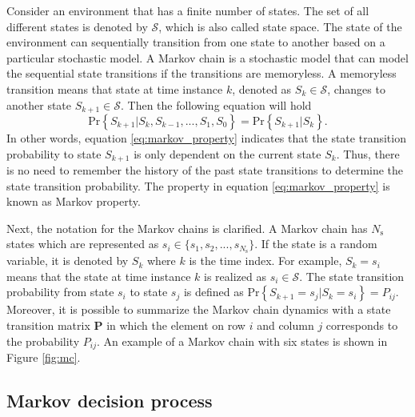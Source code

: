 \documentclass[english, 12pt, a4paper, elec, utf8, a-1b, online]{aaltothesis}
\renewcommand{\vec}[1]{\mathbf{#1}}
\newcommand{\Ss}{\mathcal{S}}
\renewcommand{\Pr}[1]{\text{Pr}\left\{ #1 \right\}}
\newcommand{\stprobs}{\vec{P}}
\newcommand{\nstates}{{N_\text{s}}}
\begin{document}
Consider an environment that has a finite number of states.
The set of all different states is denoted by $\Ss$, which is also called state space.
The state of the environment can sequentially transition from one state to another based on a particular stochastic model.
A Markov chain is a stochastic model that can model the sequential state transitions if the transitions are memoryless.
A memoryless transition means that state at time instance $k$, denoted as $S_k \in \Ss$, changes to another state $S_{k+1} \in \Ss$.
Then the following equation will hold   
\begin{equation} \label{eq:markov_property}
    \Pr{S_{k+1} | S_k, S_{k-1}, ..., S_1, S_0} = \Pr{S_{k+1} | S_k}.
\end{equation}
In other words, equation \eqref{eq:markov_property} indicates that the state transition probability to state $S_{k+1}$ is only dependent on the current state $S_k$.
Thus, there is no need to remember the history of the past state transitions to determine the state transition probability.
The property in equation \eqref{eq:markov_property} is known as Markov property.

Next, the notation for the Markov chains is clarified.
A Markov chain has $\nstates$ states which are represented as $s_i \in \{s_1, s_2, ..., s_{\nstates} \}$.
If the state is a random variable, it is denoted by $S_k$ where $k$ is the time index.
For example, $S_k = s_i$ means that the state at time instance $k$ is realized as $s_i \in \Ss$. 
The state transition probability from state $s_i$ to state $s_j$ is defined as $\Pr{S_{k+1}=s_j | S_{k}=s_i}=P_{ij}$.
Moreover, it is possible to summarize the Markov chain dynamics with a state transition matrix $\stprobs$ in which the element on row $i$ and column $j$ corresponds to the probability $P_{ij}$.
An example of a Markov chain with six states is shown in Figure \ref{fig:mc}.

\subsection{Markov decision process} \label{sec:MDP}
\end{document}
